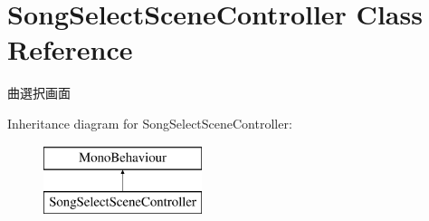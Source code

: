 \hypertarget{class_song_select_scene_controller}{}\section{Song\+Select\+Scene\+Controller Class Reference}
\label{class_song_select_scene_controller}


曲選択画面  


Inheritance diagram for Song\+Select\+Scene\+Controller\+:\begin{figure}[H]
\begin{center}
\leavevmode
\includegraphics[height=2.000000cm]{class_song_select_scene_controller}
\end{center}
\end{figure}
